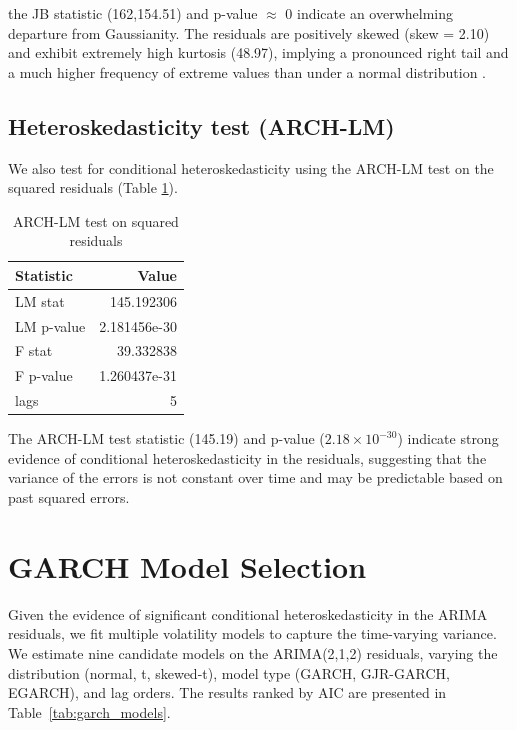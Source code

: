 \documentclass[letterpaper]{article} %
\begin{document}
the JB statistic (162,154.51) and p-value $\approx$ 0 indicate an overwhelming departure from Gaussianity. The residuals are positively skewed (skew = 2.10) and exhibit extremely high kurtosis (48.97), implying a pronounced right tail and a much higher frequency of extreme values than under a normal distribution \cite{cont2001}.


\subsection{Heteroskedasticity test (ARCH-LM)}
We also test for conditional heteroskedasticity using the ARCH-LM test on the squared residuals (Table \ref{tab:arch_lm}).

\begin{table}[ht]
\centering
\caption{ARCH-LM test on squared residuals}
\label{tab:arch_lm}
\begin{tabular}{l r}
\hline
\textbf{Statistic} & \textbf{Value} \\
\hline
LM stat & 145.192306 \\
LM p-value & 2.181456e-30 \\
F stat & 39.332838 \\
F p-value & 1.260437e-31 \\
lags & 5 \\
\hline
\end{tabular}
\end{table}

The ARCH-LM test statistic (145.19) and p-value ($2.18\times10^{-30}$) indicate strong evidence of conditional heteroskedasticity in the residuals, suggesting that the variance of the errors is not constant over time and may be predictable based on past squared errors.



\section{GARCH Model Selection}

Given the evidence of significant conditional heteroskedasticity in the ARIMA residuals, we fit multiple volatility models to capture the time-varying variance. We estimate nine candidate models on the ARIMA(2,1,2) residuals, varying the distribution (normal, t, skewed-t), model type (GARCH, GJR-GARCH, EGARCH), and lag orders. The results ranked by AIC are presented in Table~\ref{tab:garch_models}.
\end{document}
